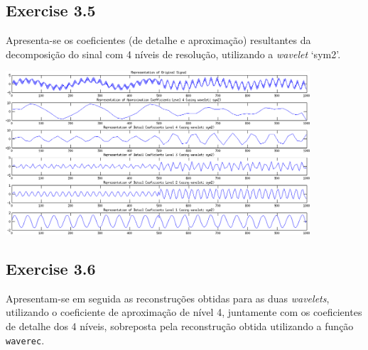 \documentclass[a4paper]{article}
\begin{document}
\subsection{Exercise 3.5}
\indent \indent Apresenta-se os coeficientes (de detalhe e aproximação) resultantes da decomposição do sinal com 4 níveis de resolução, utilizando a \emph{wavelet} `sym2'.
\begin{center}
	\includegraphics[width=0.85\textwidth]{images/ex_3_5.png}
\end{center}

\subsection{Exercise 3.6}
\indent \indent Apresentam-se em seguida as reconstruções obtidas para as duas \emph{wavelets}, utilizando o coeficiente de aproximação de nível 4, juntamente com os coeficientes de detalhe dos 4 níveis, sobreposta pela reconstrução obtida utilizando a função \texttt{waverec}.
\end{document}
